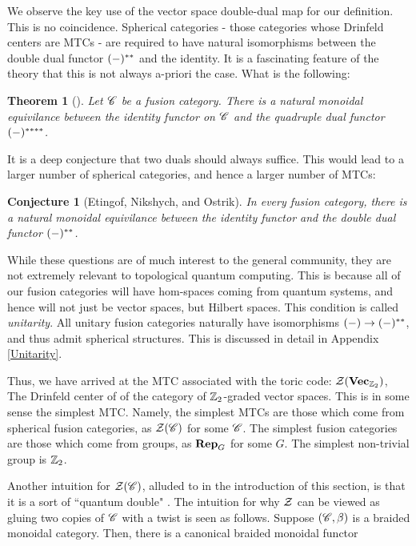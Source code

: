 \documentclass{article}
\newtheorem{theorem}{Theorem}[section]
\newtheorem{conjecture}{Conjecture}[section]
\theoremstyle{definition}
\numberwithin{figure}{section}
\begin{document}
We observe the key use of the vector space double-dual map for our definition. This is no coincidence. Spherical categories - those categories whose Drinfeld centers are MTCs - are required to have natural isomorphisms between the double dual functor $(\--)^{**}$ and the identity. It is a fascinating feature of the theory that this is not always a-priori the case. What is the following:

\begin{theorem}[\cite{etingof2005fusion}] Let $\mathscr{C}$ be a fusion category. There is a natural monoidal equivilance between the identity functor on $\mathscr{C}$ and the quadruple dual functor $(\--)^{****}$.
\end{theorem}

It is a deep conjecture that two duals should always suffice. This would lead to a larger number of spherical categories, and hence a larger number of MTCs:

\begin{conjecture}[Etingof, Nikshych, and Ostrik] In every fusion category, there is a natural monoidal equivilance between the identity functor and the double dual functor $(\--)^{**}$.
\end{conjecture}

While these questions are of much interest to the general community, they are not extremely relevant to topological quantum computing. This is because all of our fusion categories will have hom-spaces coming from quantum systems, and hence will not just be vector spaces, but Hilbert spaces. This condition is called \textit{unitarity}. All unitary fusion categories naturally have isomorphisms $(\--)\to (\--)^{**}$, and thus admit spherical structures. This is discussed in detail in Appendix \ref{Unitarity}.

Thus, we have arrived at the MTC associated with the toric code: $\mathcal{Z}(\bold{Vec}_{\mathbb{Z}_2})$, The Drinfeld center of of the category of $\mathbb{Z}_2$-graded vector spaces. This is in some sense the simplest MTC. Namely, the simplest MTCs are those which come from spherical fusion categories,  as $\mathcal{Z}(\mathscr{C})$ for some $\mathscr{C}$. The simplest fusion categories are those which come from groups, as $\bold{Rep}_G$ for some $G$. The simplest non-trivial group is $\mathbb{Z}_2$.

Another intuition for $\mathcal{Z}(\mathscr{C})$, alluded to in the introduction of this section, is that it is a sort of ``quantum double" \cite{felice2017hopf}. The intuition for why $\mathcal{Z}$ can be viewed as gluing two copies of $\mathscr{C}$ with a twist is seen as follows. Suppose $(\mathscr{C},\beta)$ is a braided monoidal category. Then, there is a canonical braided monoidal functor
\end{document}
